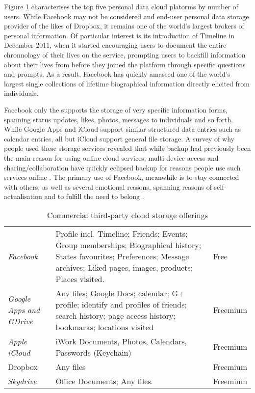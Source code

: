 \documentclass[runningheads,a4paper]{llncs}
\begin{document}
Figure \ref{fig:cloudstorage} characterises the top five personal data cloud platorms by number of users. While Facebook may not be considered and end-user personal data storage provider of the likes of Dropbox, it remains one of the world's largest brokers of personal information.  Of particular interest is its introduction of Timeline in December 2011, when it started encouraging users to document the entire chronnology of their lives on the service, prompting users to backfill information about their lives from before they joined the platform through specific questions and prompts.  As a result, Facebook has quickly amassed one of the world's largest single collections of lifetime biographical information directly elicited from individuals.

Facebook only the supports the storage of very specific information forms, spanning status updates, likes, photos, messages to individuals and so forth.  While Google Apps and iCloud support similar structured data entries such as calendar entries, all but iCloud support general file storage.  A survey of why people used these storage services revealed that while backup had previously been the main reason for using online cloud services, multi-device access and sharing/collaboration have quickly eclipsed backup for reasons people use such services online \cite{listitstudy}. The primary use of Facebook, meanwhile is to stay connected with others, as well as several emotional reasons, spanning reasons of self-actualisation and to fulfill the need to belong \cite{why-do-people-facebook}.

\begin{table}
\begin{tabular}{p{2.2cm} p{8cm} l}

\emph{Facebook} & Profile incl. Timeline; Friends; Events; Group memberships; Biographical history; States favourites; Preferences; Message archives; Liked pages, images, products; Places visited. & Free \\

\emph{Google Apps and GDrive} & Any files; Google Docs; calendar; G+ profile; identify and profiles of friends; search history; page access history; bookmarks; locations visited & Freemium\\

\emph{Apple iCloud} & iWork Documents, Photos, Calendars, Passwords (Keychain) & Freemium \\
Dropbox & Any files & Freemium \\

\emph{Skydrive} & Office Documents; Any files. & Freemium \\

\end{tabular}
\caption{Commercial third-party cloud storage offerings}
\label{fig:cloudstorage}
\end{table}
\end{document}
